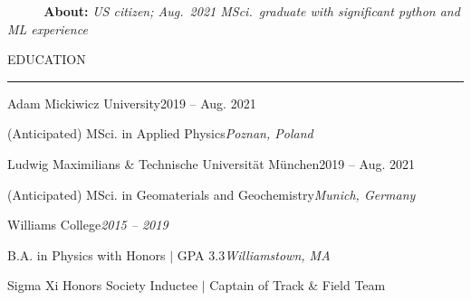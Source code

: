 \documentclass{short_resume} %
\renewenvironment{rSection}[1]{
	\sectionskip
	\textcolor{RoyalPurple}{\MakeUppercase{#1}}
	\sectionlineskip
	\hrule
	\begin{list}{}{
			\setlength{\leftmargin}{1.5em}
		}
		\item[]
	}{
	\end{list}
}
\begin{document}
	\vspace{-1em}
	\hfill \textbf{ ~~~~~About: }\textit{US citizen; Aug.~2021 MSci.~graduate with significant python and ML experience} \hfill
	\vspace{-1em}
	
	\begin{rSection}{Education} 

		\begin{rSubsection}{Adam Mickiwicz University}{2019 -- Aug. 2021}{}{}
			\vspace{-.2em}
			\item[] {(Anticipated) MSci. in Applied Physics}\hfill{\em Poznan, Poland}
		\end{rSubsection}
	\vspace{-.5em}
		\begin{rSubsection}{Ludwig Maximilians \& Technische Universit{\"a}t M{\"u}nchen}{2019 -- Aug. 2021}{}{}
		\vspace{-.2em}
		\item[] {(Anticipated) MSci. in Geomaterials and Geochemistry}\hfill{\em Munich, Germany}
		\end{rSubsection}
	\vspace{-.4em}
		\begin{rSubsection}{Williams College}{\em 2015 -- 2019}{}{}
			\vspace{-.2em}
			\item[] {B.A. in Physics with Honors $\vert$ GPA 3.3}\hfill{\em Williamstown, MA}
			\item[] Sigma Xi Honors Society Inductee $\vert$ Captain of Track \& Field Team	
		\end{rSubsection}
	\end{rSection}
		
\end{document}
